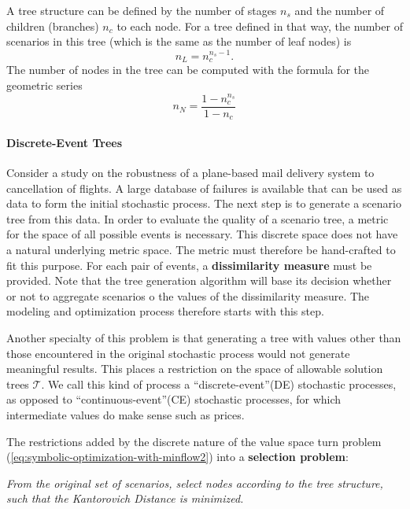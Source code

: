 A tree structure can be defined by the number of stages $n_s$ and the number of children (branches) $n_c$ to each node. For a tree defined in that way, the number of scenarios in this tree (which is the same as the number of leaf nodes) is
\begin{equation}
  \label{eq:number-of-leaf-nodes}
  n_L = n_c^{n_s-1}.
\end{equation}
The number of nodes in the tree can be computed with the formula for the geometric series
\begin{equation}
  \label{eq:number-of-nodes}
  n_N = \frac{1-n_c^{n_s}}{1-n_c}
\end{equation}
\paragraph{Discrete-Event Trees} Consider a study on the robustness of a plane-based mail delivery system to cancellation of flights.
A large database of failures is available that can be used as data to form the initial stochastic process.
The next step is to generate a scenario tree from this data.
In order to evaluate the quality of a scenario tree, a metric for the space of all possible events is necessary.
This discrete space does not have a natural underlying metric space.
The metric must therefore be hand-crafted to fit this purpose.
For each pair of events, a \textbf{dissimilarity measure} must be provided.
Note that the tree generation algorithm will base its decision whether or not to aggregate scenarios o the values of the dissimilarity measure.
The modeling and optimization process therefore starts with this step.

Another specialty of this problem is that generating a tree with values other than those encountered in the original stochastic process would not generate meaningful results.
This places a restriction on the space of allowable solution trees $\mathcal{T}$.
We call this kind of process a ``discrete-event''(DE) stochastic processes, as opposed to ``continuous-event''(CE) stochastic processes, for which intermediate values do make sense such as prices.

The restrictions added by the discrete nature of the value space turn problem (\ref{eq:symbolic-optimization-with-minflow2}) into a \textbf{selection problem}:
\begin{center}
  \textit{From the original set of scenarios, select nodes according to the tree structure, such that the Kantorovich Distance is minimized.}
\end{center}
